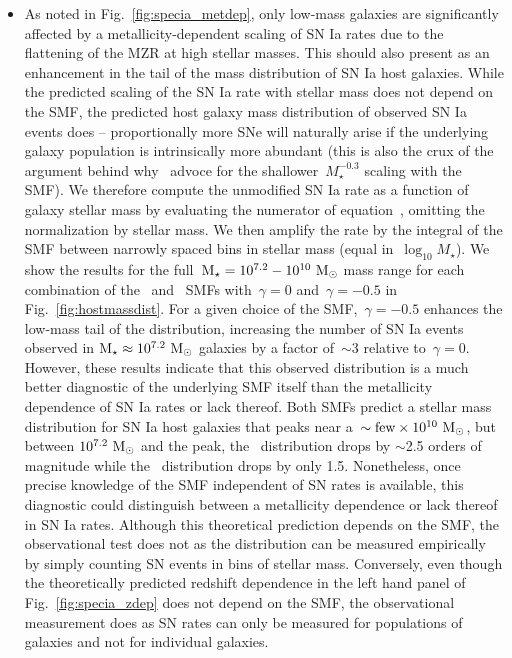\documentclass[ms.tex]{subfiles}
\begin{document}
\begin{itemize}
	\item As noted in Fig.~\ref{fig:specia_metdep}, only low-mass galaxies are
	significantly affected by a metallicity-dependent scaling of SN Ia rates
	due to the flattening of the MZR at high stellar masses.
	This should also present as an enhancement in the tail of the mass
	distribution of SN Ia host galaxies.
	While the predicted scaling of the SN Ia rate with stellar mass does not
	depend on the SMF, the predicted host galaxy mass distribution of observed
	SN Ia events does -- proportionally more SNe will naturally arise if the
	underlying galaxy population is intrinsically more abundant (this is also
	the crux of the argument behind why~\citealt{Gandhi2022} advoce for the
	shallower~$M_\star^{-0.3}$ scaling with the~\citealt{Baldry2012} SMF).
	We therefore compute the unmodified SN Ia rate as a function of galaxy
	stellar mass by evaluating the numerator of equation~,
	omitting the normalization by stellar mass.
	We then amplify the rate by the integral of the SMF between narrowly
	spaced bins in stellar mass (equal in~$\log_{10} M_\star$).
	We show the results for the full~$\text{M}_\star = 10^{7.2} - 10^{10}~\text{M}_\odot$ mass
	range for each combination of the~\citet{Bell2003} and~\citet{Baldry2012}
	SMFs with~$\gamma = 0$ and~$\gamma = -0.5$ in Fig.~\ref{fig:hostmassdist}.
	For a given choice of the SMF,~$\gamma = -0.5$ enhances the low-mass tail
	of the distribution, increasing the number of SN Ia events observed in
	$\text{M}_\star \approx 10^{7.2}~\text{M}_\odot$ galaxies by a factor of~$\sim$3 relative
	to~$\gamma = 0$.
	However, these results indicate that this observed distribution is a much
	better diagnostic of the underlying SMF itself than the metallicity
	dependence of SN Ia rates or lack thereof.
	Both SMFs predict a stellar mass distribution for SN Ia host galaxies that
	peaks near a~$\sim \text{few} \times 10^{10}~\text{M}_\odot$, but between
	$10^{7.2}~\text{M}_\odot$ and the peak, the~\citet{Bell2003} distribution drops by
	$\sim$2.5 orders of magnitude while the~\citet{Baldry2012} distribution
	drops by only 1.5.
	Nonetheless, once precise knowledge of the SMF independent of SN rates is
	available, this diagnostic could distinguish between a metallicity
	dependence or lack thereof in SN Ia rates.
	Although this theoretical prediction depends on the SMF, the observational
	test does not as the distribution can be measured empirically by simply
	counting SN events in bins of stellar mass.
	Conversely, even though the theoretically predicted redshift dependence in
	the left hand panel of Fig.~\ref{fig:specia_zdep} does not depend on the
	SMF, the observational measurement does as SN rates can only be measured
	for populations of galaxies and not for individual galaxies.


\end{itemize}
\end{document}
